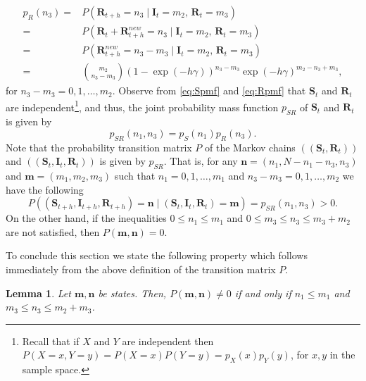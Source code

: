 \documentclass[a4paper,preprint]{elsarticle}
\newtheorem{lemma}{Lemma}
\renewcommand{\vec}[1]{\boldsymbol{#1}}
\begin{document}
\begin{equation}
\begin{split}
\label{eq:Rpmf} 
p_R(n_3)=&P(\vec{R}_{t+h}=n_3 \mid \vec{I}_{t}=m_2 \mbox{, } \vec{R}_{t}=m_3)\\    
=&P(\vec{R}_{t} + \vec{R}_{t+h}^{new}=n_3 \mid \vec{I}_{t}=m_2 \mbox{, } \vec{R}_{t}=m_3) \\
=&P(\vec{R}_{t+h}^{new}=n_3-m_3 \mid \vec{I}_{t}=m_2 \mbox{, } \vec{R}_{t}=m_3) \\
=& {\binom{m_2}{n_3-m_3}}(1-\exp(-h\gamma))^{n_3-m_3}\exp(-h\gamma)^{m_2-n_3+m_3},      
\end{split}
\end{equation}
for $n_3-m_3=0,1,\ldots,m_2$. Observe from \eqref{eq:Spmf} and \eqref{eq:Rpmf} that $\vec{S}_{t}$ and $\vec{R}_{t}$ are independent\footnote{Recall that if $X$ and $Y$ are independent then $P(X= x,Y= y)=P(X= x)P(Y= y)=p_{X}(x)p_{Y}(y)$, for $x,y$ in the sample space.}, and thus, the joint probability mass function $p_{SR}$ of $\vec{S}_{t}$ and $\vec{R}_{t}$ is given by
%
\begin{equation}
\label{eq:jpmf} 
p_{SR}(n_1,n_3)=p_S(n_1)p_R(n_3).    
\end{equation}
%
Note that the probability transition matrix $P$ of the Markov chains $((\vec{S}_{t},\vec{R}_{t}))$ and $((\vec{S}_{t},\vec{I}_{t}, \vec{R}_{t}))$ is given by $p_{SR}$. That is,  
for any $\vec{n}=(n_1,N-n_1-n_3,n_3)$ and $\vec{m}=(m_1,m_2,m_3)$ such that $n_1=0,1,\ldots,m_1$ and $n_3-m_3=0,1,\ldots,m_2$ we have the following
\begin{equation}
\label{eqn:finalform}
P((\vec{S}_{t+h}, \vec{I}_{t+h}, \vec{R}_{t+h})=\vec{n}\mid (\vec{S}_{t}, \vec{I}_{t}, \vec{R}_{t})=\vec{m})
=p_{SR}(n_1,n_3)>0.
\end{equation}
%
On the other hand, if the inequalities  $0\leq n_1\leq m_1$ and $0\leq m_3 \leq n_3 \leq m_3+m_2$ are not satisfied, then $P(\vec{m},\vec{n})=0$. 

To conclude this section we state the following property which follows immediately from the above definition of the transition matrix $P$.
\begin{lemma}\label{lem:succ}
    Let $\vec{m},\vec{n}$ be states. Then, $P(\vec{m},\vec{n}) \neq 0$ if
    and only if $n_1 \leq m_1$ and $m_3 \leq n_3 \leq m_2 + m_3$.
\end{lemma}

\end{document}
